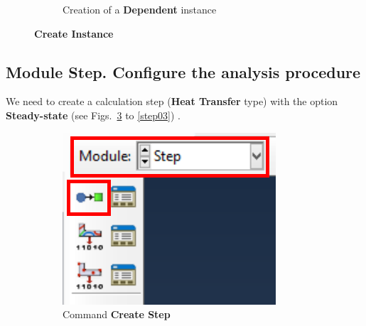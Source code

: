 \begin{figure}[!h]
\begin{subfigure}[!h]{0.39\textwidth}
      \caption{Creation of a \textbf{Dependent} instance}
      \label{asse02}
    \end{subfigure}%
    \caption{\textbf{Create Instance}}
  \end{figure}

  \subsection{Module Step. Configure the analysis procedure}

  We need to create a calculation step (\textbf{Heat Transfer} type)
  with the option \textbf{Steady-state} (see Figs.~\ref{step01} to
  \ref{step03}) .
  \begin{figure}[!h]
    \centering
    \begin{subfigure}[!h]{0.20\textwidth}
      \includegraphics[width=\textwidth]{./body/images/step01.pdf}
      \caption{Command \textbf{Create Step}}
      \label{step01}
    \end{subfigure}%
    ~
    \begin{subfigure}[!h]{0.39\textwidth}

\end{subfigure}
\end{figure}
